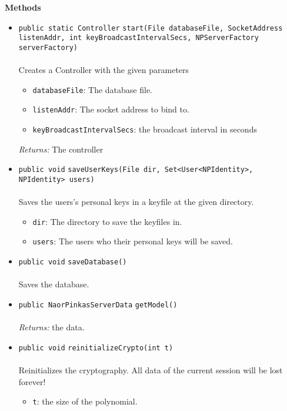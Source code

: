 \textbf{\sffamily Methods}
\begin{itemize}
\item \lstinline|public static Controller| \lstinline|start|\lstinline|(File databaseFile, SocketAddress listenAddr, int keyBroadcastIntervalSecs, NPServerFactory serverFactory)|\\ \\[-0.6em]
Creates a Controller with the given parameters
\begin{itemize}
\item \lstinline|databaseFile|: The database file.
\item \lstinline|listenAddr|: The socket address to bind to.
\item \lstinline|keyBroadcastIntervalSecs|: the broadcast interval in seconds
\end{itemize}

\emph{Returns:} The controller

\item \lstinline|public void| \lstinline|saveUserKeys|\lstinline|(File dir, Set<User<NPIdentity>, NPIdentity> users)|\\ \\[-0.6em]
Saves the users's personal keys in a keyfile at the given directory.
\begin{itemize}
\item \lstinline|dir|: The directory to save the keyfiles in.
\item \lstinline|users|: The users who their personal keys will be saved.
\end{itemize}



\item \lstinline|public void| \lstinline|saveDatabase|\lstinline|()|\\ \\[-0.6em]
Saves the database.



\item \lstinline|public NaorPinkasServerData| \lstinline|getModel|\lstinline|()|\\ \\[-0.6em]
\emph{Returns:} the data.



\item \lstinline|public void| \lstinline|reinitializeCrypto|\lstinline|(int t)|\\ \\[-0.6em]
Reinitializes the cryptography. 
 All data of the current session will be lost forever!
\begin{itemize}
\item \lstinline|t|: the size of the polynomial.
\end{itemize}




\end{itemize}
